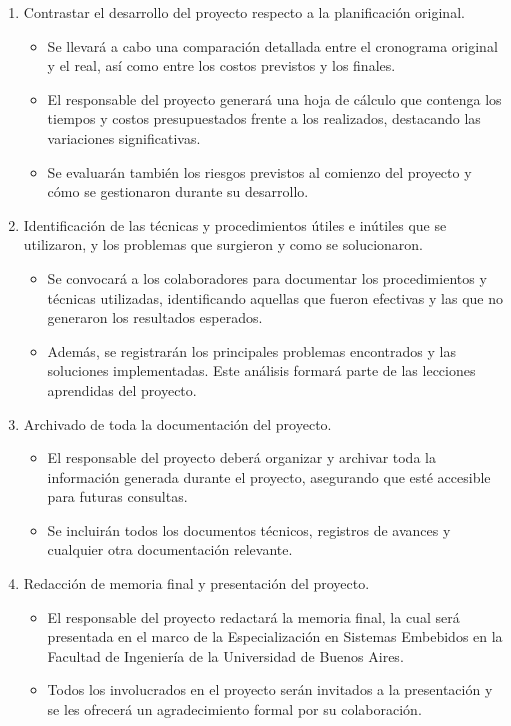\documentclass[
11pt, %
]{charter}
\begin{document}
\begin{enumerate}
	\item Contrastar el desarrollo del proyecto respecto a la planificación original.
		\begin{itemize}
			\item Se llevará a cabo una comparación detallada entre el cronograma original y el real, así como entre los costos previstos y los finales.
			\item El responsable del proyecto generará una hoja de cálculo que contenga los tiempos y costos presupuestados frente a los realizados, destacando las variaciones significativas.
			\item Se evaluarán también los riesgos previstos al comienzo del proyecto y cómo se gestionaron durante su desarrollo.
		\end{itemize}

	\item Identificación de las técnicas y procedimientos útiles e inútiles que se utilizaron, y los
problemas que surgieron y como se solucionaron.
		\begin{itemize}
			\item Se convocará a los colaboradores para documentar los procedimientos y técnicas utilizadas, identificando aquellas que fueron efectivas y las que no generaron los resultados esperados.
			\item Además, se registrarán los principales problemas encontrados y las soluciones implementadas. Este análisis formará parte de las lecciones aprendidas del proyecto.
		\end{itemize}
		
	\item Archivado de toda la documentación del proyecto.
		\begin{itemize}
			\item El responsable del proyecto deberá organizar y archivar toda la información generada durante el proyecto, asegurando que esté accesible para futuras consultas.
			\item Se incluirán todos los documentos técnicos, registros de avances y cualquier otra documentación relevante.
		\end{itemize}
		
	\item Redacción de memoria final y presentación del proyecto.
		\begin{itemize}
			\item El responsable del proyecto redactará la memoria final, la cual será presentada en el marco de la Especialización en Sistemas Embebidos en la Facultad de Ingeniería de la Universidad de Buenos Aires.
			\item Todos los involucrados en el proyecto serán invitados a la presentación y se les ofrecerá un agradecimiento formal por su colaboración.
		\end{itemize}

\end{enumerate}
\end{document}
